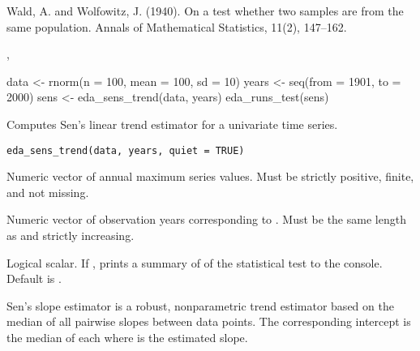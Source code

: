 \documentclass[a4paper]{book}
\begin{document}
%
\begin{References}
Wald, A. and Wolfowitz, J. (1940). On a test whether two samples are from the
same population. Annals of Mathematical Statistics, 11(2), 147–162.
\end{References}
%
\begin{SeeAlso}
, 
\end{SeeAlso}
%
\begin{Examples}
\begin{ExampleCode}
data <- rnorm(n = 100, mean = 100, sd = 10)
years <- seq(from = 1901, to = 2000)
sens <- eda_sens_trend(data, years)
eda_runs_test(sens)

\end{ExampleCode}
\end{Examples}
%
\begin{Description}
Computes Sen's linear trend estimator for a univariate time series.
\end{Description}
%
\begin{Usage}
\begin{verbatim}
eda_sens_trend(data, years, quiet = TRUE)
\end{verbatim}
\end{Usage}
%
\begin{Arguments}
\begin{ldescription}
\item[\code{data}] Numeric vector of annual maximum series values.
Must be strictly positive, finite, and not missing.

\item[\code{years}] Numeric vector of observation years corresponding to .
Must be the same length as  and strictly increasing.

\item[\code{quiet}] Logical scalar. If , prints a summary of of the statistical
test to the console. Default is .
\end{ldescription}
\end{Arguments}
%
\begin{Details}
Sen's slope estimator is a robust, nonparametric trend estimator based on the
median of all pairwise slopes between data points. The corresponding intercept
is the median of each  where  is the estimated slope.
\end{Details}
\end{document}
